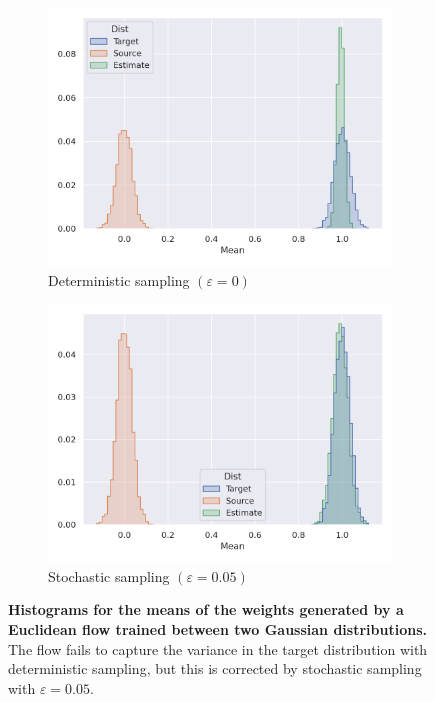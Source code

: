 \begin{figure}[h!]
    \centering
    \begin{subfigure}{0.47\linewidth}
        \centering
        \includegraphics[width=\linewidth]{figures/gaussian/0.png}
        \caption{Deterministic sampling $(\varepsilon = 0)$}
        \label{fig:gaussian_deterministic}
    \end{subfigure}
    \begin{subfigure}{0.47\linewidth}
        \centering
        \includegraphics[width=\linewidth]{figures/gaussian/0.05.png}
        \caption{Stochastic sampling $(\varepsilon = 0.05)$}
        \label{fig:gaussian_stochastic}
    \end{subfigure}
    \caption{\label{fig:gaussian-results}\textbf{Histograms for the means of the weights generated by a Euclidean flow trained between two Gaussian distributions.} The flow fails to capture the variance in the target distribution with deterministic sampling, but this is corrected by stochastic sampling with $\varepsilon = 0.05$.} 
\end{figure}

